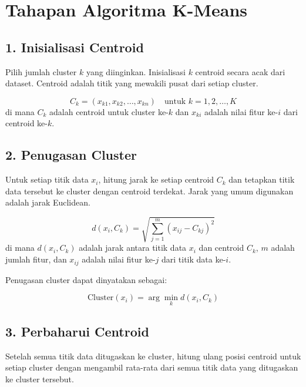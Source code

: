 \documentclass[
  oneside]{book}
\begin{document}
\section{Tahapan Algoritma K-Means}\label{tahapan-algoritma-k-means}

\subsection*{1. Inisialisasi Centroid}\label{inisialisasi-centroid}

Pilih jumlah cluster \(k\) yang diinginkan. Inisialisasi \(k\) centroid secara acak dari dataset. Centroid adalah titik yang mewakili pusat dari setiap cluster.

\[
C_k = (x_{k1}, x_{k2}, \ldots, x_{kn}) \quad \text{untuk } k = 1, 2, \ldots, K
\]
di mana \(C_k\) adalah centroid untuk cluster ke-\(k\) dan \(x_{ki}\) adalah nilai fitur ke-\(i\) dari centroid ke-\(k\).

\subsection*{2. Penugasan Cluster}\label{penugasan-cluster}

Untuk setiap titik data \(x_i\), hitung jarak ke setiap centroid \(C_k\) dan tetapkan titik data tersebut ke cluster dengan centroid terdekat. Jarak yang umum digunakan adalah jarak Euclidean.

\[
d(x_i, C_k) = \sqrt{\sum_{j=1}^{m} (x_{ij} - C_{kj})^2}
\]
di mana \(d(x_i, C_k)\) adalah jarak antara titik data \(x_i\) dan centroid \(C_k\), \(m\) adalah jumlah fitur, dan \(x_{ij}\) adalah nilai fitur ke-\(j\) dari titik data ke-\(i\).

Penugasan cluster dapat dinyatakan sebagai:

\[
\text{Cluster}(x_i) = \arg\min_{k} d(x_i, C_k)
\]

\subsection*{3. Perbaharui Centroid}\label{perbaharui-centroid}

Setelah semua titik data ditugaskan ke cluster, hitung ulang posisi centroid untuk setiap cluster dengan mengambil rata-rata dari semua titik data yang ditugaskan ke cluster tersebut.
\end{document}
